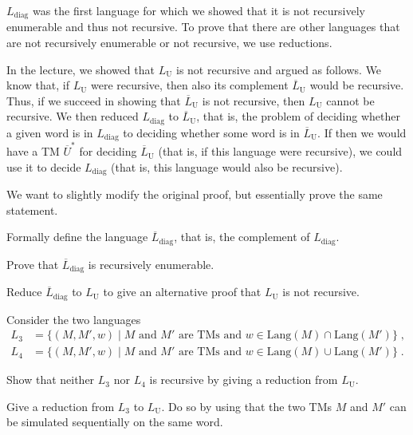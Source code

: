 \documentclass{exercise}
\begin{document}
$L_{\text{diag}}$ was the first language for which we showed that it is not recursively
enumerable and thus not recursive.  To prove that there are other
languages that are not recursively enumerable or not recursive, we use reductions.

In the lecture, we showed that $L_{\text{U}}$ is not recursive and argued as
follows.  We know that, if $L_{\text{U}}$ were recursive, then also its
complement $\overline{L}_{\text{U}}$ would be recursive.  Thus, if we succeed
in showing that $\overline{L}_{\text{U}}$ is not recursive, then $L_{\text{U}}$
cannot be recursive.  We then reduced $L_{\text{diag}}$ to
$\overline{L}_{\text{U}}$, that is, the problem of deciding whether a given
word is in $L_{\text{diag}}$ to deciding whether some word is in
$\overline{L}_{\text{U}}$.  If then we would have a TM $\overline{U}^*$ for deciding
$\overline{L}_{\text{U}}$ (that is, if this language were recursive), we could
use it to decide $L_{\text{diag}}$ (that is, this language would also be
recursive).

\nosubtask We want to slightly modify the original proof, but essentially prove the same statement.

\subtask Formally define the language $\overline{L}_{\text{diag}}$, that is, the complement of $L_{\text{diag}}$.


\subtask Prove that $\overline{L}_{\text{diag}}$ is recursively enumerable.


\subtask Reduce $\overline{L}_{\text{diag}}$ to $L_{\text{U}}$ to give an alternative proof that $L_{\text{U}}$ is not
  recursive.



Consider the two languages
\begin{align*}
  L_3 &=\{(M,M',w) \mid M \text{ and } M' \text{ are TMs and } w\in \text{Lang}(M)\cap \text{Lang}(M')\}\;,\\
  L_4 &=\{(M,M',w) \mid M \text{ and } M' \text{ are TMs and } w\in \text{Lang}(M)\cup \text{Lang}(M')\}\;.
\end{align*}

\subtask Show that neither $L_3$ nor $L_4$ is recursive by giving a reduction from $L_{\text{U}}$.


\subtask Give a reduction from $L_3$ to $L_{\text{U}}$.  Do so by using that the two TMs $M$ and $M'$
    can be simulated sequentially on the same word.
\end{document}

